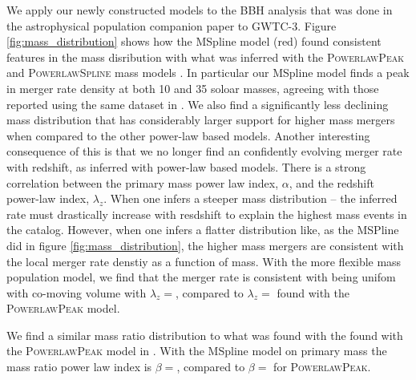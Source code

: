 
We apply our newly constructed models to the BBH analysis that was done in the astrophysical population companion paper to GWTC-3. 
Figure \ref{fig:mass_distribution} shows how the MSpline model (red) found consistent features in the mass disribution with 
what was inferred with the \textsc{PowerlawPeak} and \textsc{PowerlawSpline} mass models \cite{Talbot_2019,o3a_pop,Edelman_2022ApJ,o3b_astro_dist}. 
In particular our MSpline model finds a peak in merger rate density at both 10 and 35 soloar masses, agreeing with those reported using the same dataset in \citet{o3b_astro_dist}. 
We also find a significantly less declining mass distribution that has considerably larger support for higher mass mergers when 
compared to the other power-law based models. Another interesting consequence of this is that we no longer find an confidently
evolving merger rate with redshift, as inferred with power-law based models. There is a strong correlation between the primary mass 
power law index, $\alpha$, and the redshift power-law index, $\lambda_z$. When one infers a steeper mass distribution -- the inferred 
rate must drastically increase with resdshift to explain the highest mass events in the catalog. However, when one infers a 
flatter distribution like, as the MSPline did in figure \ref{fig:mass_distribution}, the higher mass mergers are consistent with 
the local merger rate denstiy as a function of mass. With the more flexible mass population model, we find that the merger rate 
is consistent with being unifom with co-moving volume with $\lambda_z = $\result{$\CIPlusMinus{\macros[MSplineIIDCompSpins][lamb]}$}, compared 
to $\lambda_z = $\result{$\CIPlusMinus{\macros[PLPeak][lamb]}$} found with the \textsc{PowerlawPeak} model.

We find a similar mass ratio distribution to what was found with the found with the \textsc{PowerlawPeak} model in \citet{o3b_astro_dist}. 
With the MSpline model on primary mass the mass ratio power law index is $\beta = $\result{$\CIPlusMinus{\macros[MSplineIIDCompSpins][beta]}$}, 
compared to $\beta = $\result{$\CIPlusMinus{\macros[PLPeak][beta]}$} for \textsc{PowerlawPeak}.

